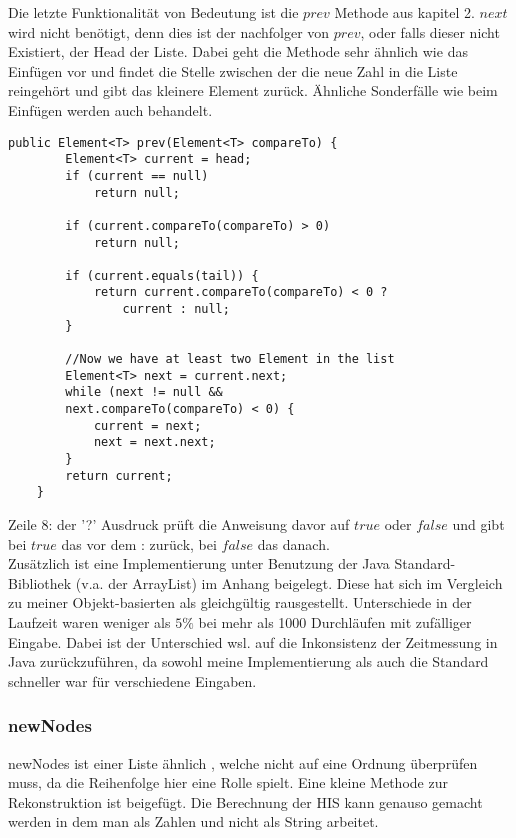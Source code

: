 Die letzte Funktionalität von Bedeutung ist die $prev$ Methode aus kapitel 2. $next$ wird nicht benötigt, denn dies ist der nachfolger von $prev$, oder falls dieser nicht Existiert, der Head der Liste. Dabei geht die Methode sehr ähnlich wie das Einfügen vor und findet die Stelle zwischen der die neue Zahl in die Liste reingehört und gibt das kleinere Element zurück. Ähnliche Sonderfälle wie beim Einfügen werden auch behandelt.


\begin{lstlisting}[mathescape]
public Element<T> prev(Element<T> compareTo) {
        Element<T> current = head;
        if (current == null)
            return null;
            
        if (current.compareTo(compareTo) > 0)
            return null;
            
        if (current.equals(tail)) {
            return current.compareTo(compareTo) < 0 ?
                current : null;
        }
        
        //Now we have at least two Element in the list
        Element<T> next = current.next;
        while (next != null &&
        next.compareTo(compareTo) < 0) {
            current = next;
            next = next.next;
        }
        return current;
    }
\end{lstlisting}
\begin{small}
    \footnotesize Zeile 8: der '?' Ausdruck prüft die Anweisung davor auf $true$ oder $false$ und gibt bei $true$ das vor dem : zurück, bei $false$ das danach.\\ Zusätzlich ist eine Implementierung unter Benutzung der Java Standard-Bibliothek (v.a. der ArrayList) im Anhang beigelegt. Diese hat sich im Vergleich zu meiner Objekt-basierten als gleichgültig rausgestellt. Unterschiede in der Laufzeit waren weniger als $5\%$ bei mehr als 1000 Durchläufen mit zufälliger Eingabe. Dabei ist der Unterschied wsl. auf die Inkonsistenz der Zeitmessung in Java zurückzuführen, da sowohl meine Implementierung als auch die Standard schneller war für verschiedene Eingaben.
\end{small}

\subsubsection*{newNodes}
newNodes ist einer Liste ähnlich , welche nicht auf eine Ordnung überprüfen muss, da die Reihenfolge hier eine Rolle spielt. Eine kleine Methode zur Rekonstruktion ist beigefügt. Die Berechnung der HIS kann genauso gemacht werden in dem man als Zahlen und nicht als String arbeitet.

